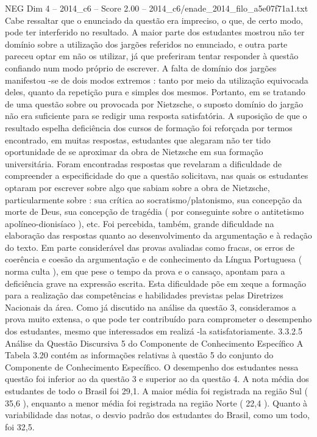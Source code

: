 \begin{textsample}{NEG Dim 4 – 2014\_c6 – Score 2.00 – 2014\_c6/enade\_2014\_filo\_a5e07f71a1.txt}
Cabe ressaltar que o enunciado da questão era impreciso, o que, de certo modo, pode ter interferido no resultado.
A maior parte dos estudantes mostrou não ter domínio sobre a utilização dos jargões referidos no enunciado, e outra parte pareceu optar em não os utilizar, já que preferiram tentar responder à questão confiando num modo próprio de escrever.
A falta de domínio dos jargões manifestou -se de dois modos extremos : tanto por meio da utilização equivocada deles, quanto da repetição pura e simples dos mesmos.
Portanto, em se tratando de uma questão sobre ou provocada por Nietzsche, o suposto domínio do jargão não era suficiente para se redigir uma resposta satisfatória.
A suposição de que o resultado espelha deficiência dos cursos de formação foi reforçada por termos encontrado, em muitas respostas, estudantes que alegaram não ter tido oportunidade de se aproximar da obra de Nietzsche em sua formação universitária.
Foram encontradas respostas que revelaram a dificuldade de compreender a especificidade do que a questão solicitava, nas quais os estudantes optaram por escrever sobre algo que sabiam sobre a obra de Nietzsche, particularmente sobre : sua crítica ao socratismo/platonismo, sua concepção da morte de Deus, sua concepção de tragédia ( por conseguinte sobre o antitetismo apolíneo-dionisíaco ), etc.
Foi percebida, também, grande dificuldade na elaboração das respostas quanto ao desenvolvimento da argumentação e à redação do texto.
Em parte considerável das provas avaliadas como fracas, os erros de coerência e coesão da argumentação e de conhecimento da Língua Portuguesa ( norma culta ), em que pese o tempo da prova e o cansaço, apontam para a deficiência grave na expressão escrita.
Esta dificuldade põe em xeque a formação para a realização das competências e habilidades previstas pelas Diretrizes Nacionais da área.
Como já discutido na análise da questão 3, consideramos a prova muito extensa, o que pode ter contribuído para comprometer o desempenho dos estudantes, mesmo que interessados em realizá -la satisfatoriamente. 3.3.2.5 Análise da Questão Discursiva 5 do Componente de Conhecimento Específico A Tabela 3.20 contém as informações relativas à questão 5 do conjunto do Componente de Conhecimento Específico.
O desempenho dos estudantes nessa questão foi inferior ao da questão 3 e superior ao da questão 4.
A nota média dos estudantes de todo o Brasil foi 29,1.
A maior média foi registrada na região Sul ( 35,6 ), enquanto a menor média foi registrada na região Norte ( 22,4 ).
Quanto à variabilidade das notas, o desvio padrão dos estudantes do Brasil, como um todo, foi 32,5.

\end{textsample}

